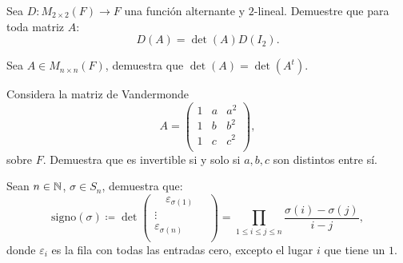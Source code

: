 \documentclass[12pt,a4paper]{book}
\begin{document}
    \begin{ejercicio}
        Sea $D : M_{2 \times 2}(F) \to F$ una función alternante y $2$-lineal. Demuestre que para toda matriz $A$:
        \[
        D(A) =  \det(A) D(I_2).
        \]
    \end{ejercicio}

    \begin{ejercicio}
        Sea $A \in M_{n \times n}(F)$, demuestra que $\det(A) = \det(A^t)$.
    \end{ejercicio}

    \begin{ejercicio}
        Considera la matriz de Vandermonde
        \[ 
        A = 
        \begin{pmatrix}
            1 & a & a^2\\
            1 & b & b^2\\
            1 & c & c^2\\
        \end{pmatrix},
        \]
        sobre $F$. Demuestra que es invertible si y solo si $a, b, c$ son distintos entre sí.
    \end{ejercicio}

    \begin{ejercicio}
        Sean $n \in \mathbb{N}$, $\sigma \in S_n$, demuestra que:
        \[
        \text{signo}(\sigma) \coloneqq \det
        \begin{pmatrix}
            \quad \varepsilon_{\sigma (1)} \quad \\
            \vdots\\
            \varepsilon_{\sigma (n)}\\
        \end{pmatrix}
        = \prod_{1 \leq i \leq j \leq n} \frac{\sigma (i) - \sigma(j)}{i - j},
        \]
        donde $\varepsilon_i$ es la fila con todas las entradas cero, excepto el lugar $i$ que tiene un $1$.
    \end{ejercicio}

\end{document}

